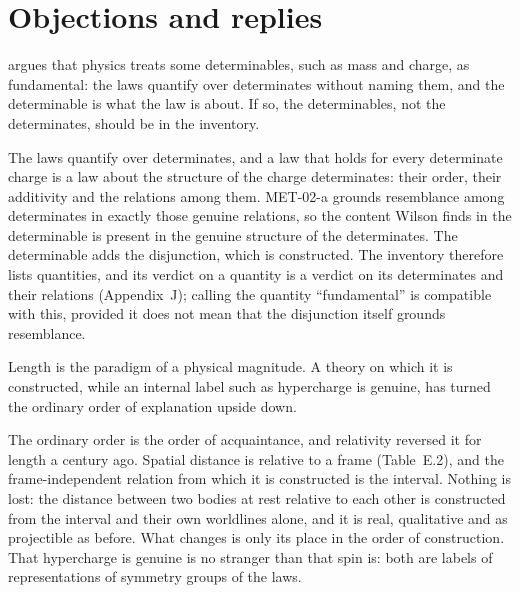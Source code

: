 \documentclass{situationist-preprint}
\begin{document}
\section{Objections and replies}\label{s:objections}

\begin{objection}\label{o:determinables}
\citet{Wilson2012} argues that physics treats some determinables, such as mass and charge, as fundamental: the laws quantify over determinates without naming them, and the determinable is what the law is about. If so, the determinables, not the determinates, should be in the inventory.
\end{objection}

\begin{reply}
The laws quantify over determinates, and a law that holds for every determinate charge is a law about the structure of the charge determinates: their order, their additivity and the relations among them. MET-02-a grounds resemblance among determinates in exactly those genuine relations, so the content Wilson finds in the determinable is present in the genuine structure of the determinates. The determinable adds the disjunction, which is constructed. The inventory therefore lists quantities, and its verdict on a quantity is a verdict on its determinates and their relations (Appendix~J); calling the quantity \enquote{fundamental} is compatible with this, provided it does not mean that the disjunction itself grounds resemblance.
\end{reply}

\begin{objection}
Length is the paradigm of a physical magnitude. A theory on which it is constructed, while an internal label such as hypercharge is genuine, has turned the ordinary order of explanation upside down.
\end{objection}

\begin{reply}
The ordinary order is the order of acquaintance, and relativity reversed it for length a century ago. Spatial distance is relative to a frame (Table~E.2), and the frame-independent relation from which it is constructed is the interval. Nothing is lost: the distance between two bodies at rest relative to each other is constructed from the interval and their own worldlines alone, and it is real, qualitative and as projectible as before. What changes is only its place in the order of construction. That hypercharge is genuine is no stranger than that spin is: both are labels of representations of symmetry groups of the laws.
\end{reply}
\end{document}
